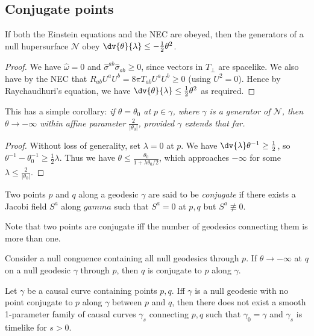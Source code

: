 \documentclass{jknotes}
\begin{document}
\subsection{Conjugate points}
\begin{lemma}
    If both the Einstein equations and the NEC are obeyed, then the generators of a null hupersurface \(\mathcal{N}\) obey \(\dv{\theta}{\lambda}\le - \frac{1}{2}\theta^2\).
    \label{needed}
\end{lemma}
\begin{proof}
    We have \(\hat{\omega} = 0\) and \(\hat{\sigma}^{ab}\hat{\sigma}_{ab}\ge 0\), since vectors in \(T_\perp\) are spacelike. We also have by the NEC that \(R_{ab}U^aU^b = 8\pi T_{ab}U^aU^b \ge 0\) (using \(U^2 =0\)). Hence by Raychaudhuri's equation, we have \(\dv{\theta}{\lambda} \le \frac{1}{2}\theta^2\) as required.
\end{proof}
This has a simple corollary: \emph{if \(\theta = \theta_0\) at \(p \in \gamma\), where \(\gamma\) is a generator of \(\mathcal{N}\), then \(\theta \to -\infty\) within affine parameter \(\frac{2}{|\theta_0|}\), provided \(\gamma\) extends that far.}
\begin{proof}
    Without loss of generality, set \(\lambda = 0\) at \(p\). We have \(\dv{\lambda} \theta^{-1} \ge \frac{1}{2}\), so \(\theta^{-1}-\theta_0^{-1} \ge \frac{1}{2}\lambda\). Thus we have \(\theta \le \frac{\theta_0}{1+\lambda\theta_0/2}\), which approaches \(-\infty\) for some \(\lambda \le \frac{2}{|\theta_0|}\).
\end{proof}

\begin{defn}
    Two points \(p\) and \(q\) along a geodesic \(\gamma\) are said to be \emph{conjugate} if there exists a Jacobi field \(S^a\) along \(gamma\) such that \(S^a = 0\) at \(p,q\) but \(S^a \not\equiv 0\).
\end{defn}
Note that two points are conjugate iff the number of geodesics connecting them is more than one.

\begin{theorem}
    Consider a null conguence containing all null geodesics through \(p\). If \(\theta\to-\infty\) at \(q\) on a null geodesic \(\gamma\) through \(p\), then \(q\) is conjugate to \(p\) along \(\gamma\).
    \label{ineedthis}
\end{theorem}
\begin{theorem}
    Let \(\gamma\) be a causal curve containing points \(p,q\). Iff \(\gamma\) is a null geodesic with no point conjugate to \(p\) along \(\gamma\) between \(p\) and \(q\), then there does not exist a smooth 1-parameter family of causal curves \(\gamma_s\) connecting \(p,q\) such that \(\gamma_0=\gamma\) and \(\gamma_s\) is timelike for \(s>0\).
\end{theorem}
\end{document}
